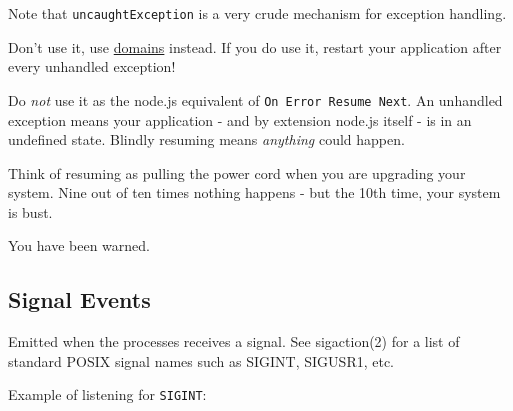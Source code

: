 \begin{Shaded}
\begin{Highlighting}[]
\NormalTok{(}\NormalTok{, }
  \NormalTok{(} 
\NormalTok{\});}

\NormalTok{() \{}
  \NormalTok{(}\NormalTok{);}
\NormalTok{\}, }\NormalTok{);}

\NormalTok{(}\NormalTok{);}
\end{Highlighting}
\end{Shaded}

Note that \texttt{uncaughtException} is a very crude mechanism for
exception handling.

Don't use it, use \href{domain.html}{domains} instead. If you do use it,
restart your application after every unhandled exception!

Do \emph{not} use it as the node.js equivalent of
\texttt{On Error Resume Next}. An unhandled exception means your
application - and by extension node.js itself - is in an undefined
state. Blindly resuming means \emph{anything} could happen.

Think of resuming as pulling the power cord when you are upgrading your
system. Nine out of ten times nothing happens - but the 10th time, your
system is bust.

You have been warned.

\subsection{Signal Events}

Emitted when the processes receives a signal. See sigaction(2) for a
list of standard POSIX signal names such as SIGINT, SIGUSR1, etc.

Example of listening for \texttt{SIGINT}:

\begin{Shaded}
\begin{Highlighting}[]
\NormalTok{();}

\NormalTok{(}\NormalTok{, }\NormalTok{() \{}
  \NormalTok{(}\NormalTok{);}
\NormalTok{\});}
\end{Highlighting}
\end{Shaded}

